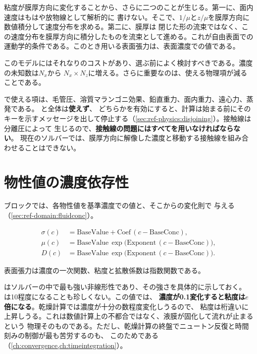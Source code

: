 粘度が膜厚方向に変化することから、さらに二つのことが生じる。第一に、面内速度はもはや放物線として解析的に
書けない。そこで、$1/\mu$と$z/\mu$を膜厚方向に数値積分して速度分布を求める。第二に、膜厚は
閉じた形の流束ではなく、この速度分布を膜厚方向に積分したものを流束として進める。これが自由表面での
運動学的条件である。このとき用いる表面張力は、表面濃度での値である。

このモデルにはそれなりのコストがあり、選ぶ前によく検討すべきである。濃度の未知数は$N_x$から
$N_x \times N_z$に増える。さらに重要なのは、使える物理項が減ることである。

\begin{warn}
  で使える項は、毛管圧、溶質マランゴニ効果、鉛直重力、面内重力、遠心力、蒸発である。
  と全体は\textbf{使えず}、
  どちらかを有効にすると、計算は始まる前にそのキーを示すメッセージを出して停止する（\cref{sec:ref-physics:disjoining}）。接触線は分離圧によって
  生じるので、\textbf{接触線の問題にはすべて}\textbf{を用いなければならない}。
  現在のソルバーでは、膜厚方向に解像した濃度と移動する接触線を組み合わせることはできない。
\end{warn}

\section{物性値の濃度依存性}
\label{sec:conc:properties}

ブロックでは、各物性値を基準濃度での値と、そこからの変化則で
与える（\cref{sec:ref-domain:fluidconc}）。

\begin{align}
  \sigma(c) &= \mathrm{BaseValue}
    + \mathrm{Coef}\,(c - \mathrm{BaseConc}),
    \label{eq:prop-sigma}\\
  \mu(c) &= \mathrm{BaseValue}\,
    \exp\bigl(\mathrm{Exponent}\,(c - \mathrm{BaseConc})\bigr),
    \label{eq:prop-mu}\\
  D(c) &= \mathrm{BaseValue}\,
    \exp\bigl(\mathrm{Exponent}\,(c - \mathrm{BaseConc})\bigr).
    \label{eq:prop-diff}
\end{align}

表面張力は濃度の一次関数、粘度と拡散係数は指数関数である。

はソルバーの中で最も強い非線形性であり、その強さを具体的に示しておく。
は10程度になることも珍しくない。この値では、
\textbf{濃度が0.1変化すると粘度は$e$倍になる}。乾燥計算では濃度が十分の数程度変化しうるので、
粘度は桁違いに上昇しうる。これは数値計算上の不都合ではなく、液膜が固化して流れが止まるという
物理そのものである。ただし、乾燥計算の終盤でニュートン反復と時間刻みの制御が最も苦労するのも、
このためである（\cref{ch:convergence,ch:timeintegration}）。

